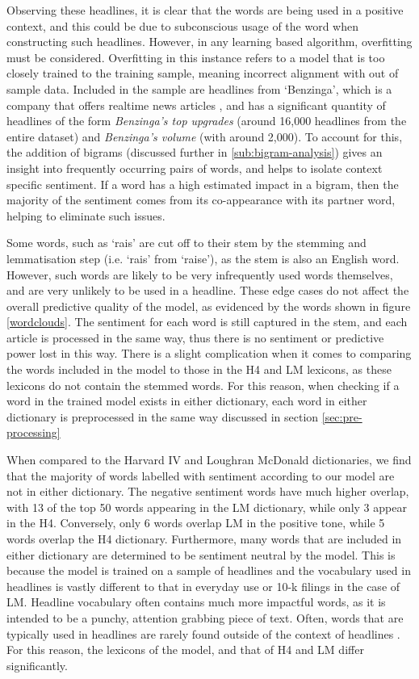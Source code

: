 Observing these headlines, it is clear that the words are being used in a positive context, and this could be due to subconscious usage of the word when constructing such headlines. However, in any learning based algorithm, overfitting must be considered. Overfitting in this instance refers to a model that is too closely trained to the training sample, meaning incorrect alignment with out of sample data. Included in the sample are headlines from `Benzinga', which is a company that offers realtime news articles \parencite{benzinga-website}, and has a significant quantity of headlines of the form \textit{Benzinga's top upgrades} (around 16,000 headlines from the entire dataset) and \textit{Benzinga's volume} (with around 2,000). To account for this, the addition of bigrams (discussed further in \ref{sub:bigram-analysis}) gives an insight into frequently occurring pairs of words, and helps to isolate context specific sentiment. If a word has a high estimated impact in a bigram, then the majority of the sentiment comes from its co-appearance with its partner word, helping to eliminate such issues.

Some words, such as `rais' are cut off to their stem by the stemming and lemmatisation step (i.e. `rais' from `raise'), as the stem is also an English word. However, such words are likely to be very infrequently used words themselves, and are very unlikely to be used in a headline. These edge cases do not affect the overall predictive quality of the model, as evidenced by the words shown in figure \ref{wordclouds}. The sentiment for each word is still captured in the stem, and each article is processed in the same way, thus there is no sentiment or predictive power lost in this way. There is a slight complication when it comes to comparing the words included in the model to those in the H4 and LM lexicons, as these lexicons do not contain the stemmed words. For this reason, when checking if a word in the trained model exists in either dictionary, each word in either dictionary is preprocessed in the same way discussed in section \ref{sec:pre-processing}

When compared to the Harvard IV and Loughran McDonald dictionaries, we find that the majority of words labelled with sentiment according to our model are not in either dictionary. The negative sentiment words have much higher overlap, with 13 of the top 50 words appearing in the LM dictionary, while only 3 appear in the H4. Conversely, only 6 words overlap LM in the positive tone, while 5 words overlap the H4 dictionary. Furthermore, many words that are included in either dictionary are determined to be sentiment neutral by the model. This is because the model is trained on a sample of headlines and the vocabulary used in headlines is vastly different to that in everyday use or 10-k filings in the case of LM. Headline vocabulary often contains much more impactful words, as it is intended to be a punchy, attention grabbing piece of text. Often, words that are typically used in headlines are rarely found outside of the context of headlines \parencite{language-newspapers}. For this reason, the lexicons of the model, and that of H4 and LM differ significantly.

